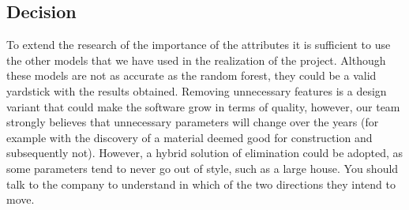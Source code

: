 \subsection{Decision}

To extend the research of the importance of the attributes it is sufficient to use the other models that we have used in the realization of the project. Although these models are not as accurate as the random forest, they could be a valid yardstick with the results obtained.
Removing unnecessary features is a design variant that could make the software grow in terms of quality, however, our team strongly believes that unnecessary parameters will change over the years (for example with the discovery of a material deemed good for construction and subsequently not). However, a hybrid solution of elimination could be adopted, as some parameters tend to never go out of style, such as a large house.
You should talk to the company to understand in which of the two directions they intend to move.